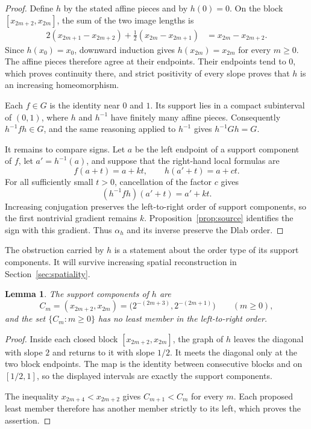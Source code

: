 \documentclass[11pt]{amsart}
\newtheorem{lemma}[theorem]{Lemma}
\theoremstyle{definition}
\theoremstyle{remark}
\numberwithin{equation}{section}
\begin{document}
\begin{proof}
Define \(h\) by the stated affine pieces and by \(h(0)=0\). On the block \([x_{2m+2},x_{2m}]\), the sum of the two image lengths is
\begin{align*}
2(x_{2m+1}-x_{2m+2})
+\frac12(x_{2m}-x_{2m+1})
&=x_{2m}-x_{2m+2}.
\end{align*}
Since \(h(x_0)=x_0\), downward induction gives \(h(x_{2m})=x_{2m}\) for every \(m\geq0\). The affine pieces therefore agree at their endpoints. Their endpoints tend to \(0\), which proves continuity there, and strict positivity of every slope proves that \(h\) is an increasing homeomorphism.

Each \(f\in G\) is the identity near \(0\) and \(1\). Its support lies in a compact subinterval of \((0,1)\), where \(h\) and \(h^{-1}\) have finitely many affine pieces. Consequently \(h^{-1}fh\in G\), and the same reasoning applied to \(h^{-1}\) gives \(h^{-1}Gh=G\).

It remains to compare signs. Let \(a\) be the left endpoint of a support component of \(f\), let \(a'=h^{-1}(a)\), and suppose that the right-hand local formulas are
\[
f(a+t)=a+kt,
\qquad
h(a'+t)=a+ct.
\]
For all sufficiently small \(t>0\), cancellation of the factor \(c\) gives
\[
(h^{-1}fh)(a'+t)=a'+kt.
\]
Increasing conjugation preserves the left-to-right order of support components, so the first nontrivial gradient remains \(k\). Proposition~\ref{prop:source} identifies the sign with this gradient. Thus \(\alpha_h\) and its inverse preserve the Dlab order.
\end{proof}

The obstruction carried by \(h\) is a statement about the order type of its support components. It will survive increasing spatial reconstruction in Section~\ref{sec:spatiality}.

\begin{lemma}
\label{lem:h-support}
The support components of \(h\) are
\[
C_m=(x_{2m+2},x_{2m})
=\bigl(2^{-(2m+3)},2^{-(2m+1)}\bigr)
\qquad(m\geq0),
\]
and the set \(\{C_m:m\geq0\}\) has no least member in the left-to-right order.
\end{lemma}

\begin{proof}
Inside each closed block \([x_{2m+2},x_{2m}]\), the graph of \(h\) leaves the diagonal with slope \(2\) and returns to it with slope \(1/2\). It meets the diagonal only at the two block endpoints. The map is the identity between consecutive blocks and on \([1/2,1]\), so the displayed intervals are exactly the support components.

The inequality \(x_{2m+4}<x_{2m+2}\) gives \(C_{m+1}<C_m\) for every \(m\). Each proposed least member therefore has another member strictly to its left, which proves the assertion.
\end{proof}
\end{document}
